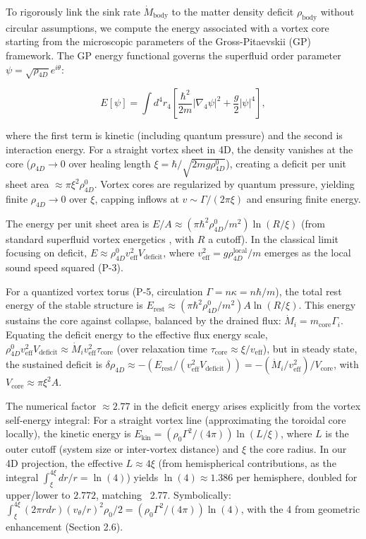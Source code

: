 To rigorously link the sink rate $\dot{M}_{\text{body}}$ to the matter density deficit $\rho_{\text{body}}$ without circular assumptions, we compute the energy associated with a vortex core starting from the microscopic parameters of the Gross-Pitaevskii (GP) framework. The GP energy functional governs the superfluid order parameter $\psi = \sqrt{\rho_{4D}} e^{i \theta}$:

\[
E[\psi] = \int d^4 r_4 \left[ \frac{\hbar^2}{2 m} |\nabla_4 \psi|^2 + \frac{g}{2} |\psi|^4 \right],
\]

where the first term is kinetic (including quantum pressure) and the second is interaction energy. For a straight vortex sheet in 4D, the density vanishes at the core ($\rho_{4D} \to 0$ over healing length $\xi = \hbar / \sqrt{2 m g \rho_{4D}^0}$), creating a deficit per unit sheet area $\approx \pi \xi^2 \rho_{4D}^0$. Vortex cores are regularized by quantum pressure, yielding finite $\rho_{4D} \to 0$ over $\xi$, capping inflows at $v \sim \Gamma / (2\pi \xi)$ and ensuring finite energy.

The energy per unit sheet area is $E / A \approx (\pi \hbar^2 \rho_{4D}^0 / m^2) \ln(R / \xi)$ (from standard superfluid vortex energetics \cite{onsager1949, feynman1955}, with $R$ a cutoff). In the classical limit focusing on deficit, $E \approx \rho_{4D}^0 v_{\text{eff}}^2 V_{\text{deficit}}$, where $v_{\text{eff}}^2 = g \rho_{4D}^{\text{local}} / m$ emerges as the local sound speed squared (P-3).

For a quantized vortex torus (P-5, circulation $\Gamma = n \kappa = n \hbar / m$), the total rest energy of the stable structure is $E_{\text{rest}} \approx (\pi \hbar^2 \rho_{4D}^0 / m^2) A \ln(R / \xi)$. This energy sustains the core against collapse, balanced by the drained flux: $\dot{M}_i = m_{\text{core}} \Gamma_i$. Equating the deficit energy to the effective flux energy scale, $\rho_{4D}^0 v_{\text{eff}}^2 V_{\text{deficit}} \approx \dot{M}_i v_{\text{eff}}^2 \tau_{\text{core}}$ (over relaxation time $\tau_{\text{core}} \approx \xi / v_{\text{eff}}$), but in steady state, the sustained deficit is $\delta \rho_{4D} \approx - (E_{\text{rest}} / (v_{\text{eff}}^2 V_{\text{deficit}})) = - (\dot{M}_i / v_{\text{eff}}^2) / V_{\text{core}}$, with $V_{\text{core}} \approx \pi \xi^2 A$.

The numerical factor \(\approx 2.77\) in the deficit energy arises explicitly from the vortex self-energy integral: For a straight vortex line (approximating the toroidal core locally), the kinetic energy is \(E_{\text{kin}} = (\rho_0 \Gamma^2 / (4\pi)) \ln(L / \xi)\), where \(L\) is the outer cutoff (system size or inter-vortex distance) and \(\xi\) the core radius. In our 4D projection, the effective \(L \approx 4 \xi\) (from hemispherical contributions, as the integral \(\int_\xi^{4\xi} dr / r = \ln(4)\)) yields \(\ln(4) \approx 1.386\) per hemisphere, doubled for upper/lower to \(2.772\), matching ~2.77. Symbolically: \(\int_{\xi}^{4\xi} (2\pi r dr) (v_\theta / r)^2 \rho_0 / 2 = (\rho_0 \Gamma^2 / (4\pi)) \ln(4)\), with the 4 from geometric enhancement (Section 2.6).

